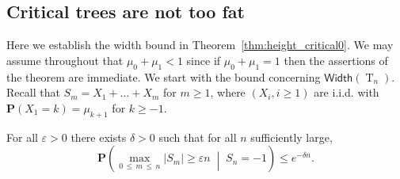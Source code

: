 \documentclass[AHL,Unicode,longabstracts,published]{cedram}
\newcommand{\p}{\mathbf{P}}
\newcommand{\Width}{\mathsf{Width}}
\DeclareMathOperator{\rtree}{T}
\newcommand{\set}[1]{\left(#1 \right)}
\newcommand{\Cprob}[2]{\mathbf{P}\set{\left. #1 \; \middle| \; #2\right.}}
\providecommand{\eps}{}
\renewcommand{\eps}{\varepsilon}
\begin{document}
\subsection{Critical trees are not too fat} Here we establish the width bound in Theorem~\ref{thm:height_critical0}. We may assume throughout that $\mu_0+\mu_1<1$ since if $\mu_0+\mu_1=1$ then the assertions of the theorem are immediate. We start with the bound concerning $\Width(\rtree_{n})$. Recall that $S_m=X_1+\ldots+X_m$ for $m \ge 1$, where $(X_i,i \ge 1)$ are i.i.d. with $\p(X_1=k)=\mu_{k+1}$ for $k \ge -1$.

\begin{prop}\label{prop:width_bound}
For all $\eps > 0$ there exists $\delta > 0$ such that for all $n$ sufficiently large,
\[
\Cprob{\max_{0\,\le\,m\,\le\,n} |S_m| \ge \eps n}{S_n=-1} \le e^{-\delta n}.
\]
\end{prop}
\end{document}
